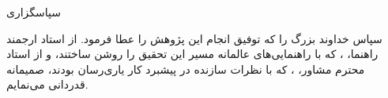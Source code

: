 \thispagestyle{empty}
\begin{center}
  {\XTitr\large سپاسگزاری}
\end{center}
\vspace{1.2em}

\noindent
سپاس خداوند بزرگ را که توفیق انجام این پژوهش را عطا فرمود. از استاد ارجمند
راهنما، \textbf{\SupervisorOneFA}، که با راهنمایی‌های عالمانه مسیر این تحقیق را
روشن ساختند، و از استاد محترم مشاور، \textbf{\SupervisorTwoFA}، که با نظرات
سازنده در پیشبرد کار یاری‌رسان بودند، صمیمانه قدردانی می‌نمایم.


\clearpage
